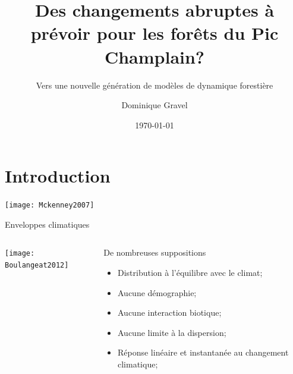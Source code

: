 \documentclass{eecslides}
\title[Forêts-CC]{Des changements abruptes à prévoir pour les forêts du Pic Champlain?}
\subtitle{Vers une nouvelle génération de modèles de dynamique forestière}
\author[D. Gravel]{Dominique Gravel}
\institute[Chaire de recherche EEC]{UQAR -- Chaire de Recherche EEC}
\date{\today}
\begin{document}

	\begin{frame}[plain]
		\titlepage
	\end{frame}
	
	\section{Introduction}

	\begin{frame}
		\begin{center}
			\texttt{[image: Mckenney2007]}
		\end{center}
	\end{frame}


	\begin{frame}{Enveloppes climatiques}
		\begin{columns}
			\begin{column}{0.5\textwidth}
				\begin{center}
					\texttt{[image: Boulangeat2012]}
				\end{center}
			\end{column}
			\begin{column}{0.5\textwidth}
			De nombreuses suppositions
				\begin{itemize}
					\item Distribution à l'équilibre avec le climat;
					\item Aucune démographie;
					\item Aucune interaction biotique;
					\item Aucune limite à la dispersion;
					\item Réponse linéaire et instantanée au changement climatique;					
				\end{itemize}
			\end{column}
		\end{columns}	    	
	\end{frame}

\end{document}
